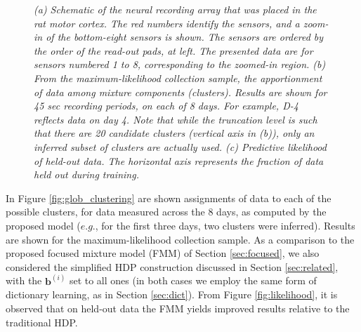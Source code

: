 \documentclass[journal]{IEEEtran}
\newcommand{\bv}{\boldsymbol{b}}
\begin{document}
\begin{figure}[!htbp]
\centering

  \caption{\small \emph{(a) Schematic of the neural
recording array that was placed in the rat motor cortex. The red
numbers identify the sensors, and a zoom-in of the bottom-eight
sensors is shown. The sensors are ordered by the order of the
read-out pads, at left. The presented data are for sensors numbered 1 to 8, corresponding to the zoomed-in region. (b) From the maximum-likelihood collection
sample, the apportionment of data among mixture components
(clusters). Results are shown for 45 sec recording periods, on each
of 8 days. For example, D-4 reflects data on day 4. Note that while the truncation level is such that there are 20 candidate clusters (vertical axis in (b)), only an inferred subset of clusters are actually used. (c) Predictive likelihood of held-out data. The
horizontal axis represents the fraction of data held out during training.}}
\end{figure}

In Figure \ref{fig:glob_clustering} are shown assignments of data to each of the possible clusters, for data measured across the 8 days, as computed by the proposed model ($e.g.$, for the first three days, two clusters were inferred). Results are shown for the maximum-likelihood collection sample. As a comparison to the proposed focused mixture model (FMM) of Section \ref{sec:focused}, we also considered the simplified HDP construction discussed in Section \ref{sec:related}, with the $\bv^{(i)}$ set to all ones (in both cases we employ the same form of dictionary learning, as in Section \ref{sec:dict}). From Figure \ref{fig:likelihood}, it is observed that on held-out data the FMM yields improved results relative to the traditional HDP.
\end{document}
